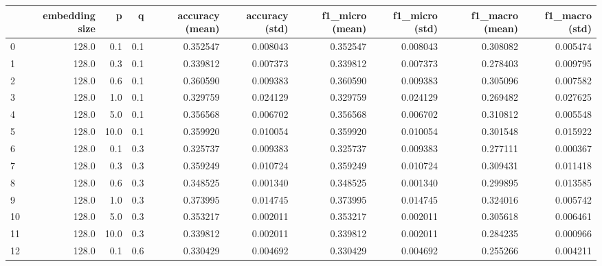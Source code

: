 \begin{tabular}{lrrrrrrrrr}
\toprule
{} &  embedding size &     p &     q &  accuracy (mean) &  accuracy (std) &  f1\_micro (mean) &  f1\_micro (std) &  f1\_macro (mean) &  f1\_macro (std) \\
\midrule
0  &           128.0 &   0.1 &   0.1 &         0.352547 &        0.008043 &         0.352547 &        0.008043 &         0.308082 &        0.005474 \\
1  &           128.0 &   0.3 &   0.1 &         0.339812 &        0.007373 &         0.339812 &        0.007373 &         0.278403 &        0.009795 \\
2  &           128.0 &   0.6 &   0.1 &         0.360590 &        0.009383 &         0.360590 &        0.009383 &         0.305096 &        0.007582 \\
3  &           128.0 &   1.0 &   0.1 &         0.329759 &        0.024129 &         0.329759 &        0.024129 &         0.269482 &        0.027625 \\
4  &           128.0 &   5.0 &   0.1 &         0.356568 &        0.006702 &         0.356568 &        0.006702 &         0.310812 &        0.005548 \\
5  &           128.0 &  10.0 &   0.1 &         0.359920 &        0.010054 &         0.359920 &        0.010054 &         0.301548 &        0.015922 \\
6  &           128.0 &   0.1 &   0.3 &         0.325737 &        0.009383 &         0.325737 &        0.009383 &         0.277111 &        0.000367 \\
7  &           128.0 &   0.3 &   0.3 &         0.359249 &        0.010724 &         0.359249 &        0.010724 &         0.309431 &        0.011418 \\
8  &           128.0 &   0.6 &   0.3 &         0.348525 &        0.001340 &         0.348525 &        0.001340 &         0.299895 &        0.013585 \\
9  &           128.0 &   1.0 &   0.3 &         0.373995 &        0.014745 &         0.373995 &        0.014745 &         0.324016 &        0.005742 \\
10 &           128.0 &   5.0 &   0.3 &         0.353217 &        0.002011 &         0.353217 &        0.002011 &         0.305618 &        0.006461 \\
11 &           128.0 &  10.0 &   0.3 &         0.339812 &        0.002011 &         0.339812 &        0.002011 &         0.284235 &        0.000966 \\
12 &           128.0 &   0.1 &   0.6 &         0.330429 &        0.004692 &         0.330429 &        0.004692 &         0.255266 &        0.004211 \\

\end{tabular}
